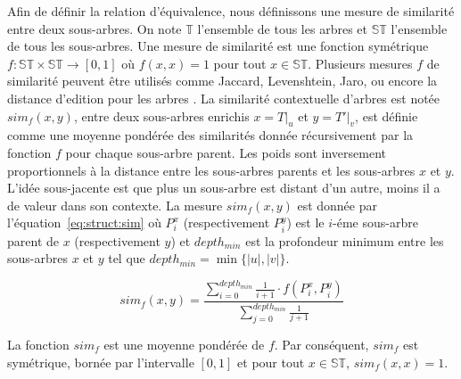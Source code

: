 Afin de définir la relation d'équivalence, nous définissons une mesure de similarité entre deux sous-arbres.
On note $\mathbb{T}$ l'ensemble de tous les arbres et $\mathbb{ST}$ l'ensemble de tous les sous-arbres.
Une mesure de similarité est une fonction symétrique $f : \mathbb{ST} \times \mathbb{ST} \to [0,1]$ où $f(x, x) = 1$ pour tout $x \in \mathbb{ST}$.
Plusieurs mesures $f$ de similarité peuvent être utilisés comme Jaccard, Levenshtein, Jaro, ou encore la distance d'edition pour les arbres \cite{zhangSimpleFastAlgorithms1989}.
La similarité contextuelle d'arbres est notée $sim_f(x, y)$, entre deux sous-arbres enrichis $x = T|_u$ et $y = T'|_v$, est définie comme une moyenne pondérée des similarités donnée récursivement par la fonction $f$ pour chaque sous-arbre parent.
Les poids sont inversement proportionnels à la distance entre les sous-arbres parents et les sous-arbres $x$ et $y$.
L'idée sous-jacente est que plus un sous-arbre est distant d'un autre, moins il a de valeur dans son contexte.
La mesure $sim_f(x, y)$ est donnée par l'équation~\ref{eq:struct:sim} où $P^x_i$ (respectivement $P^y_i$) est le $i$-éme sous-arbre parent de $x$ (respectivement $y$) et $depth_{min}$ est la profondeur minimum entre les sous-arbres $x$ et $y$ tel que $depth_{min} = \min\{|u|, |v|\}$.

\begin{equation}
    sim_f(x, y) = \frac{\sum_{i=0}^{depth_{min}} \frac{1}{i + 1} \cdot f(P^x_i, P^y_i)}{\sum_{j=0}^{depth_{min}} \frac{1}{j + 1}} \label{eq:struct:sim}
\end{equation}

\begin{axiom}
    La fonction $sim_f$ est une moyenne pondérée de $f$.
    Par conséquent, $sim_f$ est symétrique, bornée par l'intervalle $[0, 1]$ et pour tout $x \in \mathbb{ST}$, $sim_f(x, x) = 1$.
\end{axiom}

